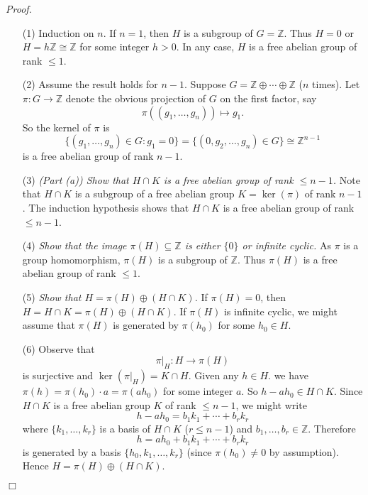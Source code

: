 \documentclass{article}
\begin{document}
\emph{Proof.}
\begin{enumerate}
\item[(1)]
  Induction on $n$.
  If $n = 1$, then $H$ is a subgroup of $G = \mathbb{Z}$.
  Thus $H = 0$ or $H = h\mathbb{Z} \cong \mathbb{Z}$ for some integer $h > 0$.
  In any case, $H$ is a free abelian group of rank $\leq 1$.

\item[(2)]
  Assume the result holds for $n-1$.
  Suppose $G = \mathbb{Z} \oplus \cdots \oplus \mathbb{Z}$ ($n$ times).
  Let $\pi: G \to \mathbb{Z}$ denote the obvious projection of $G$ on the first factor, say
  \[
    \pi((g_1, \ldots, g_n)) \mapsto g_1.
  \]
  So the kernel of $\pi$ is
  \[
    \{ (g_1, \ldots, g_n) \in G : g_1 = 0 \}
    = \{ (0, g_2, \ldots, g_n) \in G \}
    \cong \mathbb{Z}^{n-1}
  \]
  is a free abelian group of rank $n-1$.

\item[(3)]
  \emph{(Part (a)) Show that $H \cap K$ is a free abelian group of rank $\leq n-1$.}
  Note that $H \cap K$ is a subgroup of a free abelian group $K = \ker(\pi)$ of rank $n-1$.
  The induction hypothesis shows that
  $H \cap K$ is a free abelian group of rank $\leq n-1$.

\item[(4)]
  \emph{Show that the image $\pi(H) \subseteq \mathbb{Z}$ is
  either $\{ 0 \}$ or infinite cyclic.}
  As $\pi$ is a group homomorphism, $\pi(H)$ is a subgroup of $\mathbb{Z}$.
  Thus $\pi(H)$ is a free abelian group of rank $\leq 1$.

\item[(5)]
  \emph{Show that $H = \pi(H) \oplus (H \cap K)$.}
  If $\pi(H) = 0$, then $H = H \cap K = \pi(H) \oplus (H \cap K)$.
  If $\pi(H)$ is infinite cyclic,
  we might assume that $\pi(H)$ is generated by $\pi(h_0)$ for some $h_0 \in H$.

\item[(6)]
  Observe that
  \[
    \pi|_{H}: H \to \pi(H)
  \]
  is surjective and $\ker(\pi|_{H}) = K \cap H$.
  Given any $h \in H$.
  we have $\pi(h) = \pi(h_0) \cdot a = \pi(a h_0)$ for some integer $a$.
  So $h - a h_0 \in H \cap K$.
  Since $H \cap K$ is a free abelian group $K$ of rank $\leq n-1$, we might write
  \[
    h - a h_0 = b_1 k_1 + \cdots + b_r k_r
  \]
  where $\{ k_1, \ldots, k_r \}$ is a basis of $H \cap K$ ($r \leq n-1$)
  and $b_1, \ldots, b_r \in \mathbb{Z}$.
  Therefore
  \[
    h = a h_0 + b_1 k_1 + \cdots + b_r k_r
  \]
  is generated by a basis $\{ h_0, k_1, \ldots, k_r \}$
  (since $\pi(h_0) \neq 0$ by assumption).
  Hence $H = \pi(H) \oplus (H \cap K)$.
\end{enumerate}
$\Box$ \\
\end{document}

